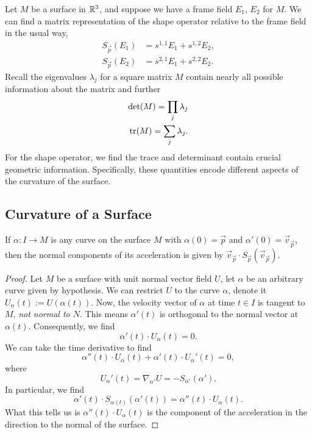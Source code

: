 Let $M$ be a surface in $\mathbb{R}^{3}$, and suppose we have a frame field
$E_{1}$, $E_{2}$ for $M$.
We can find a matrix representation of the shape operator relative to
the frame field in the usual way,
\begin{equation}
  \begin{split}
S_{\vec{p}}(E_{1}) &= s^{1,1}E_{1} + s^{1,2}E_{2},\\
S_{\vec{p}}(E_{2}) &= s^{2,1}E_{1} + s^{2,2}E_{2}.
  \end{split}
\end{equation}
Recall the eigenvalues $\lambda_{j}$ for a square matrix $M$ contain
nearly all possible information about the matrix and further
\begin{subequations}
\begin{align}
\det(M) = \prod_{j}\lambda_{j}\\
\mathop{\rm tr}\nolimits(M) = \sum_{j}\lambda_{j}.
\end{align}
\end{subequations}
For the shape operator, we find the trace and determinant contain
crucial geometric information. Specifically, these quantities encode
different aspects of the curvature of the surface.

\subsection{Curvature of a Surface}

\begin{proposition}
If $\alpha\colon I\to M$ is any curve on the surface $M$ with
$\alpha(0)=\vec{p}$ and $\alpha'(0)=\vec{v}_{\vec{p}}$, then the normal
components of its acceleration is given by $\vec{v}_{\vec{p}}\cdot S_{\vec{p}}(\vec{v}_{\vec{p}})$.
\end{proposition}

\begin{proof}
Let $M$ be a surface with unit normal vector field $U$, let $\alpha$ be
an arbitrary curve given by hypothesis. We can restrict $U$ to the curve
$\alpha$, denote it $U_{\alpha}(t) := U\left(\alpha(t)\right)$.
Now, the velocity vector of $\alpha$ at time $t\in I$ is tangent to $M$,
\emph{not normal to $N$}. This means $\alpha'(t)$ is orthogonal to the
normal vector at $\alpha(t)$. Consequently, we find
\begin{equation}
\alpha'(t)\cdot U_{\alpha}(t)=0.
\end{equation}
We can take the time derivative to find
\begin{equation}
\alpha''(t)\cdot U_{\alpha}(t) + \alpha'(t)\cdot U_{\alpha}'(t) = 0,
\end{equation}
where
\begin{equation}
U_{\alpha}'(t) = \nabla_{\alpha'}U = -S_{\alpha'}(\alpha').
\end{equation}
In particular, we find
\begin{equation}
\alpha'(t)\cdot S_{\alpha(t)}(\alpha'(t)) = \alpha''(t)\cdot U_{\alpha}(t).
\end{equation}
What this tells us is $\alpha''(t)\cdot U_{\alpha}(t)$ is the component
of the acceleration in the direction to the normal of the surface.
\end{proof}

